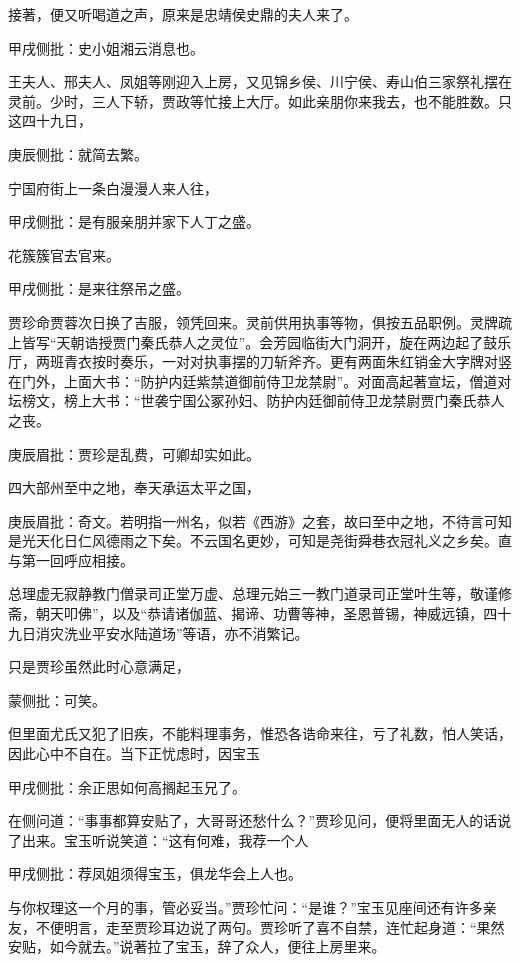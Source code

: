 \begin{parag}
    接著，便又听喝道之声，原来是忠靖侯史鼎的夫人来了。\begin{note}甲戌侧批：史小姐湘云消息也。\end{note}王夫人、邢夫人、凤姐等刚迎入上房，又见锦乡侯、川宁侯、寿山伯三家祭礼摆在灵前。少时，三人下轿，贾政等忙接上大厅。如此亲朋你来我去，也不能胜数。只这四十九日，\begin{note}庚辰侧批：就简去繁。\end{note}宁国府街上一条白漫漫人来人往，\begin{note}甲戌侧批：是有服亲朋并家下人丁之盛。\end{note}花簇簇官去官来。\begin{note}甲戌侧批：是来往祭吊之盛。\end{note}
\end{parag}


\begin{parag}
    贾珍命贾蓉次日换了吉服，领凭回来。灵前供用执事等物，俱按五品职例。灵牌疏上皆写“天朝诰授贾门秦氏恭人之灵位”。会芳园临街大门洞开，旋在两边起了鼓乐厅，两班青衣按时奏乐，一对对执事摆的刀斩斧齐。更有两面朱红销金大字牌对竖在门外，上面大书：“防护内廷紫禁道御前侍卫龙禁尉”。对面高起著宣坛，僧道对坛榜文，榜上大书：“世袭宁国公冢孙妇、防护内廷御前侍卫龙禁尉贾门秦氏恭人之丧。\begin{note}庚辰眉批：贾珍是乱费，可卿却实如此。\end{note}四大部州至中之地，奉天承运太平之国，\begin{note}庚辰眉批：奇文。若明指一州名，似若《西游》之套，故曰至中之地，不待言可知是光天化日仁风德雨之下矣。不云国名更妙，可知是尧街舜巷衣冠礼义之乡矣。直与第一回呼应相接。\end{note}总理虚无寂静教门僧录司正堂万虚、总理元始三一教门道录司正堂叶生等，敬谨修斋，朝天叩佛”，以及“恭请诸伽蓝、揭谛、功曹等神，圣恩普锡，神威远镇，四十九日消灾洗业平安水陆道场”等语，亦不消繁记。
\end{parag}


\begin{parag}
    只是贾珍虽然此时心意满足，\begin{note}蒙侧批：可笑。\end{note}但里面尤氏又犯了旧疾，不能料理事务，惟恐各诰命来往，亏了礼数，怕人笑话，因此心中不自在。当下正忧虑时，因宝玉\begin{note}甲戌侧批：余正思如何高搁起玉兄了。\end{note}在侧问道：“事事都算安贴了，大哥哥还愁什么？”贾珍见问，便将里面无人的话说了出来。宝玉听说笑道：“这有何难，我荐一个人\begin{note}甲戌侧批：荐凤姐须得宝玉，俱龙华会上人也。\end{note}与你权理这一个月的事，管必妥当。”贾珍忙问：“是谁？”宝玉见座间还有许多亲友，不便明言，走至贾珍耳边说了两句。贾珍听了喜不自禁，连忙起身道：“果然安贴，如今就去。”说著拉了宝玉，辞了众人，便往上房里来。
\end{parag}


